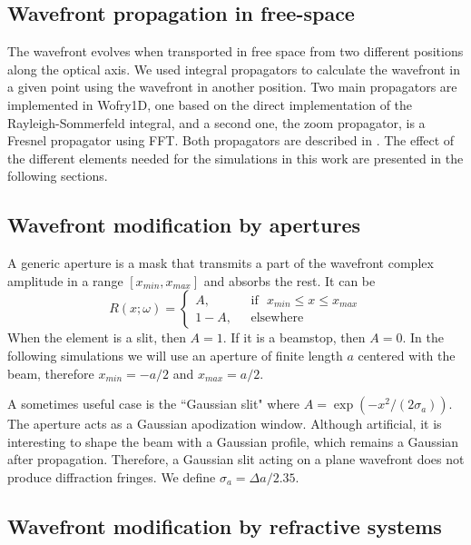\documentclass{iucr}              %
\begin{document}
\subsection{Wavefront propagation in free-space}

The wavefront evolves when transported in free space from two different positions along the optical axis. We used integral propagators to calculate the wavefront in a given point using the wavefront in another position. Two main propagators are implemented in Wofry1D, one based on the direct implementation of the  Rayleigh-Sommerfeld integral, and a second one, the zoom propagator, is a Fresnel propagator using FFT. Both propagators are described in \cite{srioLBL}. The effect of the different elements needed for the simulations in this work are presented in the following sections. 

\subsection{Wavefront modification by apertures}

A generic aperture is a mask that transmits a part of the wavefront complex amplitude in a range $[x_{min},x_{max}]$ and absorbs the rest. It can be
\begin{equation}
R(x;\omega) =
\left\{
\begin{matrix}
A,  & \mbox{~~if~~} x_{min} \le x \le x_{max}
\\ 
1 - A, & \mbox{~~elsewhere}
\end{matrix}
\right.
\end{equation}
When the element is a slit, then $A=1$. If it is a beamstop, then $A=0$. In the following simulations we will use an aperture of finite length $a$ centered with the beam, therefore $x_{min}=-a/2$ and $x_{max}=a/2$.

A sometimes useful case is the ``Gaussian slit" where $A=\exp(-x^2/(2\sigma_a))$. The aperture acts as a Gaussian apodization window. Although artificial, it is interesting to shape the beam with a Gaussian profile, which remains a Gaussian after propagation. Therefore, a Gaussian slit acting on a plane wavefront does not produce diffraction fringes.
We define $\sigma_a=\Delta a/2.35$.

\subsection{Wavefront modification by refractive systems}
\end{document}
